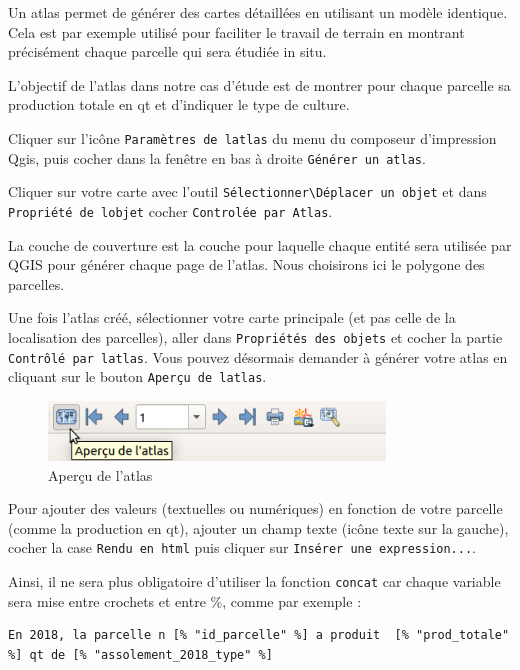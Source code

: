 Un atlas permet de générer des cartes détaillées en utilisant un modèle
identique. Cela est par exemple utilisé pour faciliter le travail de
terrain en montrant précisément chaque parcelle qui sera étudiée in
situ.

L'objectif de l'atlas dans notre cas d'étude est de montrer pour chaque
parcelle sa production totale en qt et d'indiquer le type de culture.

Cliquer sur l'icône \texttt{Paramètres\ de\ l\textquotesingle{}atlas} du
menu du composeur d'impression Qgis, puis cocher dans la fenêtre en bas
à droite \texttt{Générer\ un\ atlas}.

Cliquer sur votre carte avec l'outil
\texttt{Sélectionner\textbackslash{}Déplacer\ un\ objet} et dans
\texttt{Propriété\ de\ l\textquotesingle{}objet} cocher
\texttt{Controlée\ par\ Atlas}.

La couche de couverture est la couche pour laquelle chaque entité sera
utilisée par QGIS pour générer chaque page de l'atlas. Nous choisirons
ici le polygone des parcelles.

Une fois l'atlas créé, sélectionner votre carte principale (et pas celle
de la localisation des parcelles), aller dans
\texttt{Propriétés\ des\ objets} et cocher la partie
\texttt{Contrôlé\ par\ l\textquotesingle{}atlas}. Vous pouvez désormais
demander à générer votre atlas en cliquant sur le bouton
\texttt{Aperçu\ de\ l\textquotesingle{}atlas}.

\begin{figure}
\centering
\includegraphics[width=\textwidth,height=0.625in]{figures/generate_atlas.png}
\caption{Aperçu de l'atlas}
\end{figure}

Pour ajouter des valeurs (textuelles ou numériques) en fonction de votre
parcelle (comme la production en qt), ajouter un champ texte (icône
texte sur la gauche), cocher la case \texttt{Rendu\ en\ html} puis
cliquer sur \texttt{Insérer\ une\ expression...}.

Ainsi, il ne sera plus obligatoire d'utiliser la fonction
\texttt{concat} car chaque variable sera mise entre crochets et entre
\%, comme par exemple :

\begin{verbatim}
En 2018, la parcelle n [% "id_parcelle" %] a produit  [% "prod_totale" %] qt de [% "assolement_2018_type" %]
\end{verbatim}

